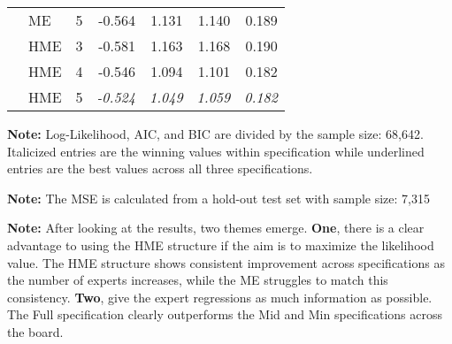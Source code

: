 \documentclass[12pt]{article}
\begin{document}
\begin{table}
\begin{threeparttable}
{\begin{tabular}[r]{l l l r r r r}
         &  ME   &    5    & -0.564  & 1.131  & 1.140  & 0.189 \\
         &  HME  &    3    & -0.581  & 1.163  & 1.168  & 0.190 \\
         &  HME  &    4    & -0.546  & 1.094  & 1.101  & 0.182 \\
         &  HME  &    5    & \it{-0.524}  & \it{1.049}  & \it{1.059}  & \it{0.182} \\
        \cmidrule(l){1-7}
    \end{tabular}
    }
    \begin{tablenotes}
      \item{\footnotesize \textbf{Note:} Log-Likelihood, AIC, and BIC are divided by the sample size: 68,642.
      Italicized entries are the winning values within specification while underlined entries are the best values across all three specifications.
      }
      \item{\footnotesize \textbf{Note:} The MSE is calculated from a hold-out test set with sample size: 7,315}
      \item{\footnotesize \textbf{Note:} After looking at the results, two themes emerge. \textbf{One}, there is a clear advantage to using the HME structure if the aim is to maximize the likelihood value.
      The HME structure shows consistent improvement across specifications as the number of experts increases,
      while the ME struggles to match this consistency. \textbf{Two}, give the expert regressions as much information as possible. The Full specification clearly outperforms the Mid and Min specifications across the board.
      }
      \item{\footnotesize }
    \end{tablenotes} \label{tbl:model_comparison}
  \end{threeparttable}
\end{table}
\end{document}
